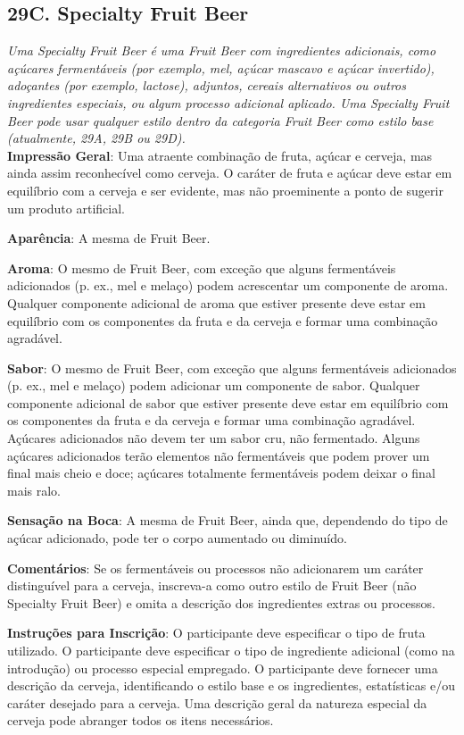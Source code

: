 \subsection*{29C. Specialty Fruit Beer}
\textit{Uma Specialty Fruit Beer é uma Fruit Beer com ingredientes adicionais, como açúcares fermentáveis (por exemplo, mel, açúcar mascavo e açúcar invertido), adoçantes (por exemplo, lactose), adjuntos, cereais alternativos ou outros ingredientes especiais, ou algum processo adicional aplicado. Uma Specialty Fruit Beer pode usar qualquer estilo dentro da categoria Fruit Beer como estilo base (atualmente, 29A, 29B ou 29D).}\\
\textbf{Impressão Geral}: Uma atraente combinação de fruta, açúcar e cerveja, mas ainda assim reconhecível como cerveja. O caráter de fruta e açúcar deve estar em equilíbrio com a cerveja e ser evidente, mas não proeminente a ponto de sugerir um produto artificial.

\textbf{Aparência}: A mesma de Fruit Beer.

\textbf{Aroma}: O mesmo de Fruit Beer, com exceção que alguns fermentáveis adicionados (p. ex., mel e melaço) podem acrescentar um componente de aroma. Qualquer componente adicional de aroma que estiver presente deve estar em equilíbrio com os componentes da fruta e da cerveja e formar uma combinação agradável.

\textbf{Sabor}: O mesmo de Fruit Beer, com exceção que alguns fermentáveis adicionados (p. ex., mel e melaço) podem adicionar um componente de sabor. Qualquer componente adicional de sabor que estiver presente deve estar em equilíbrio com os componentes da fruta e da cerveja e formar uma combinação agradável. Açúcares adicionados não devem ter um sabor cru, não fermentado. Alguns açúcares adicionados terão elementos não fermentáveis que podem prover um final mais cheio e doce; açúcares totalmente fermentáveis podem deixar o final mais ralo.

\textbf{Sensação na Boca}: A mesma de Fruit Beer, ainda que, dependendo do tipo de açúcar adicionado, pode ter o corpo aumentado ou diminuído.

\textbf{Comentários}: Se os fermentáveis ou processos não adicionarem um caráter distinguível para a cerveja, inscreva-a como outro estilo de Fruit Beer (não Specialty Fruit Beer) e omita a descrição dos ingredientes extras ou processos.

\textbf{Instruções para Inscrição}: O participante deve especificar o tipo de fruta utilizado. O participante deve especificar o tipo de ingrediente adicional (como na introdução) ou processo especial empregado. O participante deve fornecer uma descrição da cerveja, identificando o estilo base e os ingredientes, estatísticas e/ou caráter desejado para a cerveja. Uma descrição geral da natureza especial da cerveja pode abranger todos os itens necessários.

